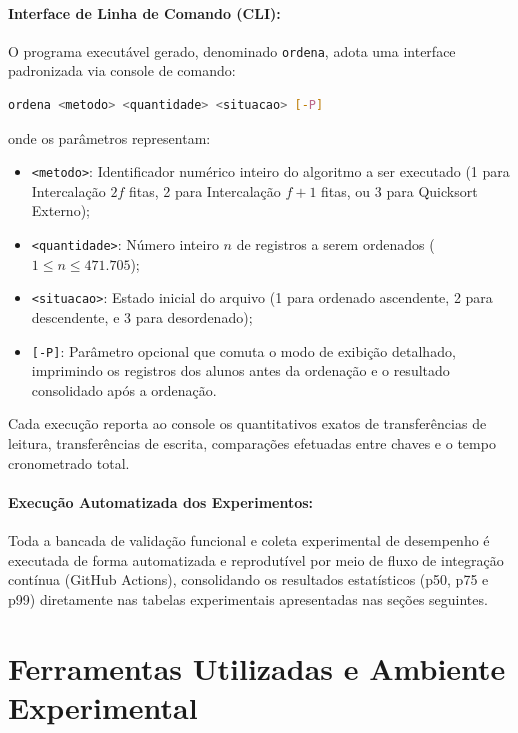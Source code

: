 \documentclass[12pt,a4paper]{article}
\begin{document}
\paragraph{Interface de Linha de Comando (CLI):}
O programa executável gerado, denominado \texttt{ordena}, adota uma interface padronizada via console de comando:
\begin{lstlisting}[language=bash,caption={Sintaxe de invocação da ferramenta de ordenação.}]
ordena <metodo> <quantidade> <situacao> [-P]
\end{lstlisting}
onde os parâmetros representam:
\begin{itemize}
    \item \texttt{<metodo>}: Identificador numérico inteiro do algoritmo a ser executado (1 para Intercalação $2f$ fitas, 2 para Intercalação $f+1$ fitas, ou 3 para Quicksort Externo);
    \item \texttt{<quantidade>}: Número inteiro $n$ de registros a serem ordenados ($1 \le n \le 471.705$);
    \item \texttt{<situacao>}: Estado inicial do arquivo (1 para ordenado ascendente, 2 para descendente, e 3 para desordenado);
    \item \texttt{[-P]}: Parâmetro opcional que comuta o modo de exibição detalhado, imprimindo os registros dos alunos antes da ordenação e o resultado consolidado após a ordenação.
\end{itemize}
Cada execução reporta ao console os quantitativos exatos de transferências de leitura, transferências de escrita, comparações efetuadas entre chaves e o tempo cronometrado total.

\paragraph{Execução Automatizada dos Experimentos:}
Toda a bancada de validação funcional e coleta experimental de desempenho é executada de forma automatizada e reprodutível por meio de fluxo de integração contínua (GitHub Actions), consolidando os resultados estatísticos (p50, p75 e p99) diretamente nas tabelas experimentais apresentadas nas seções seguintes.

\section{Ferramentas Utilizadas e Ambiente Experimental}
\label{sec:ferramentas}
\end{document}

